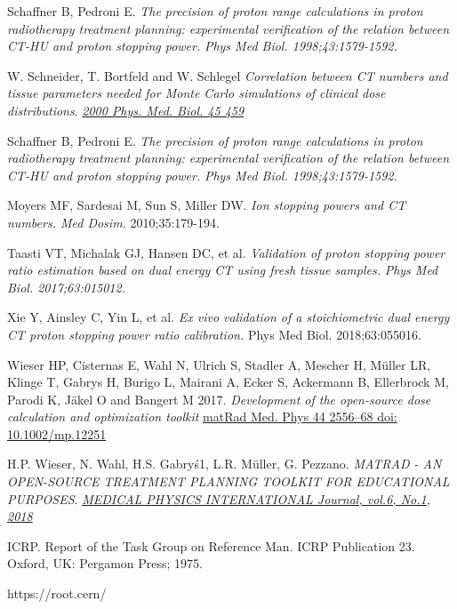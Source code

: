 \documentclass[a4paper]{article}
\begin{document}
\begin{thebibliography}{}
Schaffner B, Pedroni E.
\emph{The precision of proton range calculations in proton radiotherapy treatment planning: experimental verification of the relation between CT-HU and proton stopping power.}
\emph{Phys Med Biol. 1998;43:1579-1592.}

W. Schneider, T. Bortfeld and W. Schlegel
\emph{Correlation between CT numbers and tissue parameters
needed for Monte Carlo simulations of clinical dose
distributions}.
\href{http://iopscience.iop.org/0031-9155/45/2/314}
{\emph{2000 Phys. Med. Biol. 45 459}}

Schaffner B, Pedroni E.
\emph{The precision of proton range calculations in proton radiotherapy treatment planning: experimental verification of the relation between CT-HU and proton stopping power.}
\emph{Phys Med Biol. 1998;43:1579-1592.}

Moyers MF, Sardesai M, Sun S, Miller DW.
\emph{Ion stopping powers and CT numbers. Med Dosim.}
2010;35:179-194.

Taasti VT, Michalak GJ, Hansen DC, et al.
\emph{Validation of proton stopping power ratio estimation based
on dual energy CT using fresh tissue samples.}
\emph{Phys Med Biol. 2017;63:015012.}

Xie Y, Ainsley C, Yin L, et al.
\emph{Ex vivo validation of a stoichiometric dual energy CT proton stopping power ratio calibration.}
Phys Med Biol. 2018;63:055016.

Wieser HP, Cisternas E, Wahl N, Ulrich S, Stadler A, Mescher H, Müller LR, Klinge T, Gabrys H, Burigo L, Mairani A, Ecker S, Ackermann B, Ellerbrock M, Parodi K, Jäkel O and Bangert M 2017.
\emph{Development of the open-source dose calculation and optimization toolkit}
\href{https://aapm.onlinelibrary.wiley.com/doi/full/10.1002/mp.12251}{matRad Med. Phys 44 2556–68 doi: 10.1002/mp.12251}

H.P. Wieser, N. Wahl, H.S. Gabryś1, L.R. Müller, G. Pezzano.
\emph{MATRAD - AN OPEN-SOURCE TREATMENT PLANNING TOOLKIT FOR
EDUCATIONAL PURPOSES}.
\href{http://www.mpijournal.org/pdf/2018-01/MPI-2018-01-p119.pdf}
{\emph{MEDICAL PHYSICS INTERNATIONAL Journal, vol.6, No.1, 2018}}

ICRP. Report of the Task Group on Reference Man. ICRP Publication 23. Oxford, UK: Pergamon Press; 1975.

https://root.cern/

\end{thebibliography}
\end{document}
